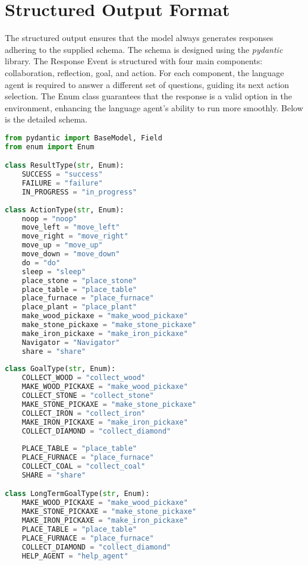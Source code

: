 \newpage
\section{Structured Output Format}
The structured output ensures that the model always generates responses adhering to the supplied schema. The schema is designed using the \textit{pydantic} library. The Response Event is structured with four main components: collaboration, reflection, goal, and action. For each component, the language agent is required to answer a different set of questions, guiding its next action selection. The Enum class guarantees that the response is a valid option in the environment, enhancing the language agent's ability to run more smoothly. Below is the detailed schema.\\

\begin{lstlisting}[language=Python]
from pydantic import BaseModel, Field
from enum import Enum

class ResultType(str, Enum):
    SUCCESS = "success"
    FAILURE = "failure"
    IN_PROGRESS = "in_progress"
    
class ActionType(str, Enum):
    noop = "noop"
    move_left = "move_left"
    move_right = "move_right"
    move_up = "move_up"
    move_down = "move_down"
    do = "do"
    sleep = "sleep"
    place_stone = "place_stone"
    place_table = "place_table"
    place_furnace = "place_furnace"
    place_plant = "place_plant"
    make_wood_pickaxe = "make_wood_pickaxe"
    make_stone_pickaxe = "make_stone_pickaxe"
    make_iron_pickaxe = "make_iron_pickaxe"
    Navigator = "Navigator"
    share = "share"
    
class GoalType(str, Enum):
    COLLECT_WOOD = "collect_wood"
    MAKE_WOOD_PICKAXE = "make_wood_pickaxe"
    COLLECT_STONE = "collect_stone"
    MAKE_STONE_PICKAXE = "make_stone_pickaxe"
    COLLECT_IRON = "collect_iron"
    MAKE_IRON_PICKAXE = "make_iron_pickaxe"
    COLLECT_DIAMOND = "collect_diamond"
    
    PLACE_TABLE = "place_table"
    PLACE_FURNACE = "place_furnace"
    COLLECT_COAL = "collect_coal"
    SHARE = "share"

class LongTermGoalType(str, Enum):
    MAKE_WOOD_PICKAXE = "make_wood_pickaxe"
    MAKE_STONE_PICKAXE = "make_stone_pickaxe"
    MAKE_IRON_PICKAXE = "make_iron_pickaxe"
    PLACE_TABLE = "place_table"
    PLACE_FURNACE = "place_furnace"
    COLLECT_DIAMOND = "collect_diamond"
    HELP_AGENT = "help_agent"
    

\end{lstlisting}
